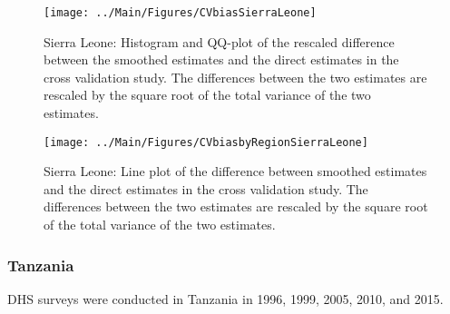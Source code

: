 \documentclass[12pt]{article}\usepackage[]{graphicx}\usepackage[]{color}
\newenvironment{knitrout}{}{} %
\begin{document}
\begin{knitrout}
\color{fgcolor}\begin{figure}[bht]

{\centering \texttt{[image: ../Main/Figures/CVbiasSierraLeone]} 

}

\caption[Sierra Leone]{Sierra Leone: Histogram and QQ-plot of the rescaled difference between the smoothed estimates and the direct estimates in the cross validation study. The differences between the two estimates are rescaled by the square root of the total variance of the two estimates.}\label{fig:unnamed-chunk-299}
\end{figure}


\end{knitrout}

\begin{knitrout}
\color{fgcolor}\begin{figure}[bht]

{\centering \texttt{[image: ../Main/Figures/CVbiasbyRegionSierraLeone]} 

}

\caption[Sierra Leone]{Sierra Leone: Line plot of the difference between smoothed estimates and the direct estimates in the cross validation study. The differences between the two estimates are rescaled by the square root of the total variance of the two estimates.}\label{fig:unnamed-chunk-300}
\end{figure}


\end{knitrout}


\clearpage
\subsubsection{Tanzania}





DHS surveys were conducted in Tanzania in 1996, 1999, 2005, 2010, and 2015.
\end{document}
